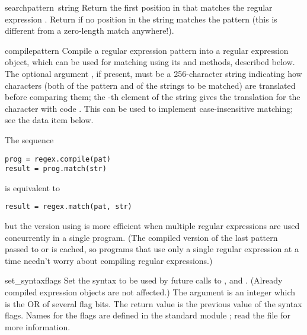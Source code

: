 \begin{funcdesc}{search}{pattern\, string}
  Return the first position in  that matches the regular
  expression .  Return  if no position in the string
  matches the pattern (this is different from a zero-length match
  anywhere!).
\end{funcdesc}

\begin{funcdesc}{compile}{pattern}
  Compile a regular expression pattern into a regular expression
  object, which can be used for matching using its  and
   methods, described below.  The optional argument
  , if present, must be a 256-character string
  indicating how characters (both of the pattern and of the strings to
  be matched) are translated before comparing them; the -th
  element of the string gives the translation for the character with
  \ASCII{} code .  This can be used to implement
  case-insensitive matching; see the  data item below.

  The sequence

\begin{verbatim}
prog = regex.compile(pat)
result = prog.match(str)
\end{verbatim}
%
is equivalent to

\begin{verbatim}
result = regex.match(pat, str)
\end{verbatim}

but the version using  is more efficient when multiple
regular expressions are used concurrently in a single program.  (The
compiled version of the last pattern passed to  or
 is cached, so programs that use only a single
regular expression at a time needn't worry about compiling regular
expressions.)
\end{funcdesc}

\begin{funcdesc}{set_syntax}{flags}
  Set the syntax to be used by future calls to ,
   and .  (Already compiled expression
  objects are not affected.)  The argument is an integer which is the
  OR of several flag bits.  The return value is the previous value of
  the syntax flags.  Names for the flags are defined in the standard 
  module ; read the
  file  for more information.
\end{funcdesc}

